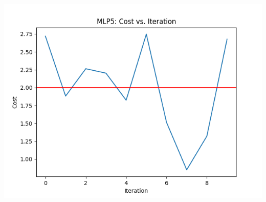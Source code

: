 \documentclass{article}
\begin{document}
\begin{center}
    \includegraphics[scale=0.5]{RI/MLP5.png}
\end{center}
\end{document}
